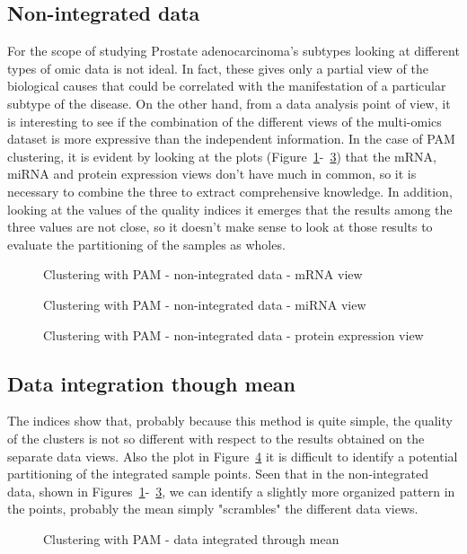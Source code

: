 \subsection{Non-integrated data}\label{pam_nonIntegrated}
For the scope of studying Prostate adenocarcinoma's subtypes looking at different types of omic data is not ideal. In fact, these gives only a partial view of the biological causes that could be correlated with the manifestation of a particular subtype of the disease. On the other hand, from a data analysis point of view, it is interesting to see if the combination of the different views of the multi-omics dataset is more expressive than the independent information. In the case of PAM clustering, it is evident by looking at the plots (Figure~\ref{fig:pam_1}-~\ref{fig:pam_3}) that the mRNA, miRNA and protein expression views don't have much in common, so it is necessary to combine the three to extract comprehensive knowledge. In addition, looking at the values of the quality indices it emerges that the results among the three values are not close, so it doesn't make sense to look at those results to evaluate the partitioning of the samples as wholes.
\begin{figure}[h]\label{fig:pam_1}
    \centering
    \caption{Clustering with PAM - non-integrated data - mRNA view}
\end{figure}
\begin{figure}[h]\label{fig:pam_2}
    \centering
    \caption{Clustering with PAM - non-integrated data - miRNA view}
\end{figure}
\begin{figure}[h]\label{fig:pam_3}
    \centering
    \caption{Clustering with PAM - non-integrated data - protein expression view}
\end{figure}

\subsection{Data integration though mean}\label{pam_mean}
The indices show that, probably because this method is quite simple, the quality of the clusters is not so different with respect to the results obtained on the separate data views. Also the plot in Figure~\ref{fig:pam_mean} it is difficult to identify a potential partitioning of the integrated sample points. Seen that in the non-integrated data, shown in Figures~\ref{fig:pam_1}-~\ref{fig:pam_3}, we can identify a slightly more organized pattern in the points, probably the mean simply "scrambles" the different data views.
\begin{figure}[h]\label{fig:pam_mean}
    \centering
    \caption{Clustering with PAM - data integrated through mean}
\end{figure}

